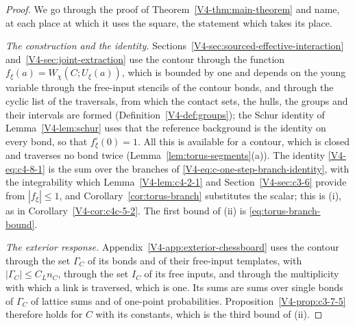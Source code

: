 \documentclass[11pt]{article}
\numberwithin{equation}{section}
\theoremstyle{remark}
\theoremstyle{plain}
\begin{document}
\begin{proof}
We go through the proof of Theorem~\ref{V4-thm:main-theorem} and name, at each place at which it uses the square, the statement which takes its place.

\emph{The construction and the identity.} Sections~\ref{V4-sec:sourced-effective-interaction} and~\ref{V4-sec:joint-extraction} use the contour through the function $f_{\xi}(a)= W_{\chi}(C;U_{\xi}(a))$, which is bounded by one and depends on the young variable through the free-input stencils of the contour bonds, and through the cyclic list of the traversals, from which the contact sets, the hulls, the groups and their intervals are formed (Definition~\ref{V4-def:groups}); the Schur identity of Lemma~\ref{V4-lem:schur} uses that the reference background is the identity on every bond, so that $f^{\circ}_{\xi}(0)=1$. All this is available for a contour, which is closed and traverses no bond twice (Lemma~\ref{lem:torus-segments}(a)). The identity \eqref{V4-eq:c4-8-1} is the sum over the branches of \eqref{V4-eq:c-one-step-branch-identity}, with the integrability which Lemma~\ref{V4-lem:c4-2-1} and Section~\ref{V4-sec:c3-6} provide from $| f_{\xi}|\leqslant 1$, and Corollary~\ref{cor:torus-branch} substitutes the scalar; this is (i), as in Corollary~\ref{V4-cor:c4c-5-2}. The first bound of (ii) is \eqref{eq:torus-branch-bound}.

\emph{The exterior response.} Appendix~\ref{V4-app:exterior-chessboard} uses the contour through the set $\Gamma_C$ of its bonds and of their free-input templates, with $|\Gamma_C|\leqslant C_Ln_C$, through the set $I_C$ of its free inputs, and through the multiplicity with which a link is traversed, which is one. Its sums are sums over single bonds of $\Gamma_C$ of lattice sums and of one-point probabilities. Proposition~\ref{V4-prop:c3-7-5} therefore holds for $C$ with its constants, which is the third bound of (ii).


\end{proof}
\end{document}
